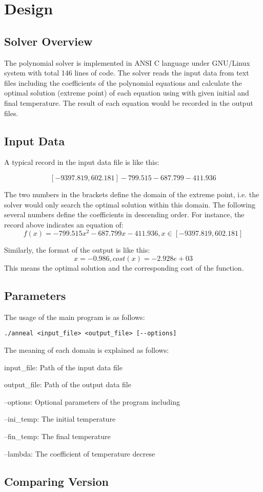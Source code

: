 \section{Design}
\label{sec:design}
\subsection{Solver Overview}
The \SA polynomial solver is implemented in ANSI C language under GNU/Linux system with total 146 lines of code. The solver reads the input data from text files including the coefficients of the polynomial equations and calculate the optimal solution (extreme point) of each equation using \SA with given initial and final temperature. The result of each equation would be recorded in the output files.
\subsection{Input Data}
A typical record in the input data file is like this:

$$[-9397.819, 602.181] -799.515 -687.799 -411.936$$

The two numbers in the brackets define the domain of the extreme point, i.e. the solver would only search the optimal solution within this domain. The following several numbers define the coefficients in descending order. For instance, the record above indicates an equation of:$$f(x) = -799.515x^2-687.799x-411.936, x\in[-9397.819, 602.181]$$

Similarly, the format of the output is like this:
$$x = -0.986, cost(x) = -2.928e+03$$
This means the optimal solution and the corresponding cost of the function. 
\subsection{Parameters}
The usage of the main program is as follows:
\begin{verbatim}
./anneal <input_file> <output_file> [--options]
\end{verbatim}
The meaning of each domain is explained as follows:
\begin{compactitem}
\item input\_file: Path of the input data file
\item output\_file: Path of the output data file
\item --options: Optional parameters of the program including 
    \begin{compactitem}
    \item --ini\_temp: The initial temperature
    \item --fin\_temp: The final temperature
    \item --lambda: The coefficient of temperature decrese
    \end{compactitem}
\end{compactitem}
\subsection{Comparing Version}